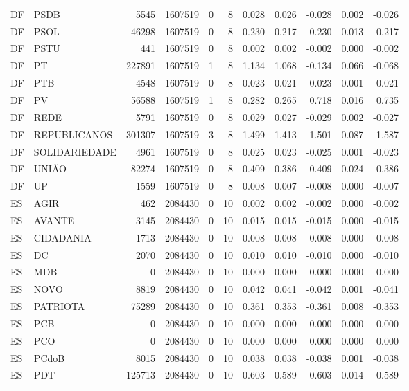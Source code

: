 \begin{landscape}
\begin{longtable}{llrrrrrrrrr}
DF & PSDB & 5545 & 1607519 & 0 & 8 & 0.028 & 0.026 & -0.028 & 0.002 & -0.026 \\
DF & PSOL & 46298 & 1607519 & 0 & 8 & 0.230 & 0.217 & -0.230 & 0.013 & -0.217 \\
DF & PSTU & 441 & 1607519 & 0 & 8 & 0.002 & 0.002 & -0.002 & 0.000 & -0.002 \\
DF & PT & 227891 & 1607519 & 1 & 8 & 1.134 & 1.068 & -0.134 & 0.066 & -0.068 \\
DF & PTB & 4548 & 1607519 & 0 & 8 & 0.023 & 0.021 & -0.023 & 0.001 & -0.021 \\
DF & PV & 56588 & 1607519 & 1 & 8 & 0.282 & 0.265 & 0.718 & 0.016 & 0.735 \\
DF & REDE & 5791 & 1607519 & 0 & 8 & 0.029 & 0.027 & -0.029 & 0.002 & -0.027 \\
DF & REPUBLICANOS & 301307 & 1607519 & 3 & 8 & 1.499 & 1.413 & 1.501 & 0.087 & 1.587 \\
DF & SOLIDARIEDADE & 4961 & 1607519 & 0 & 8 & 0.025 & 0.023 & -0.025 & 0.001 & -0.023 \\
DF & UNIÃO & 82274 & 1607519 & 0 & 8 & 0.409 & 0.386 & -0.409 & 0.024 & -0.386 \\
DF & UP & 1559 & 1607519 & 0 & 8 & 0.008 & 0.007 & -0.008 & 0.000 & -0.007 \\
ES & AGIR & 462 & 2084430 & 0 & 10 & 0.002 & 0.002 & -0.002 & 0.000 & -0.002 \\
ES & AVANTE & 3145 & 2084430 & 0 & 10 & 0.015 & 0.015 & -0.015 & 0.000 & -0.015 \\
ES & CIDADANIA & 1713 & 2084430 & 0 & 10 & 0.008 & 0.008 & -0.008 & 0.000 & -0.008 \\
ES & DC & 2070 & 2084430 & 0 & 10 & 0.010 & 0.010 & -0.010 & 0.000 & -0.010 \\
ES & MDB & 0 & 2084430 & 0 & 10 & 0.000 & 0.000 & 0.000 & 0.000 & 0.000 \\
ES & NOVO & 8819 & 2084430 & 0 & 10 & 0.042 & 0.041 & -0.042 & 0.001 & -0.041 \\
ES & PATRIOTA & 75289 & 2084430 & 0 & 10 & 0.361 & 0.353 & -0.361 & 0.008 & -0.353 \\
ES & PCB & 0 & 2084430 & 0 & 10 & 0.000 & 0.000 & 0.000 & 0.000 & 0.000 \\
ES & PCO & 0 & 2084430 & 0 & 10 & 0.000 & 0.000 & 0.000 & 0.000 & 0.000 \\
ES & PCdoB & 8015 & 2084430 & 0 & 10 & 0.038 & 0.038 & -0.038 & 0.001 & -0.038 \\
ES & PDT & 125713 & 2084430 & 0 & 10 & 0.603 & 0.589 & -0.603 & 0.014 & -0.589 \\

\end{longtable}
\end{landscape}
